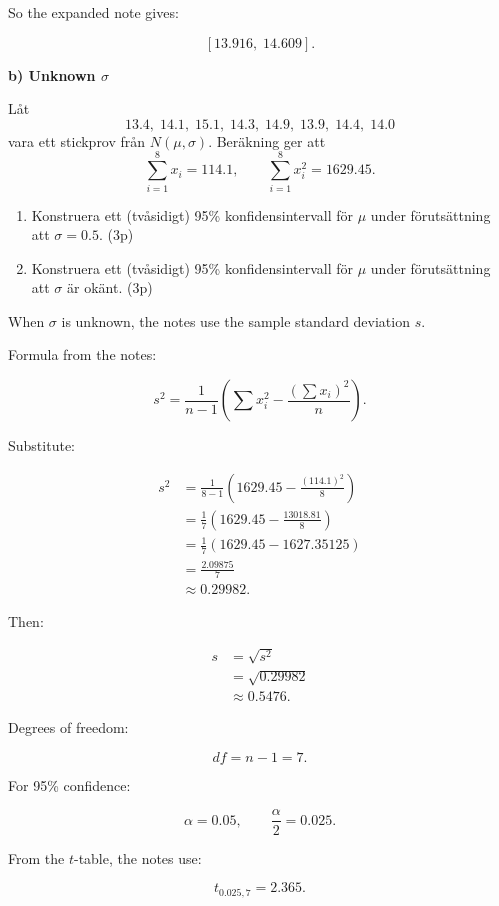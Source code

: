 \documentclass[10pt]{article}
\begin{document}
So the expanded note gives:

\[
[13.916,\;14.609].
\]

\textbf{b) Unknown \(\sigma\)}

Låt
\[
13.4,\;14.1,\;15.1,\;14.3,\;14.9,\;13.9,\;14.4,\;14.0
\]
vara ett stickprov från \(N(\mu,\sigma)\).
Beräkning ger att
\[
\sum_{i=1}^{8}x_i=114.1,
\qquad
\sum_{i=1}^{8}x_i^2=1629.45.
\]

\begin{enumerate}[label=\alph*)]
\item Konstruera ett (tvåsidigt) 95\%
konfidensintervall för \(\mu\) under
förutsättning att \(\sigma=0.5\).
\hfill (3p)

\item Konstruera ett (tvåsidigt) 95\%
konfidensintervall för \(\mu\) under
förutsättning att \(\sigma\) är okänt.
\hfill (3p)
\end{enumerate}

When \(\sigma\) is unknown, the notes use the
sample standard deviation \(s\).

Formula from the notes:

\[
s^2=
\frac{1}{n-1}
\left(
\sum x_i^2
-
\frac{(\sum x_i)^2}{n}
\right).
\]

Substitute:

\begin{align*}
s^2
&=
\frac{1}{8-1}
\left(
1629.45
-
\frac{(114.1)^2}{8}
\right) \\[2mm]
&=
\frac{1}{7}
\left(
1629.45
-
\frac{13018.81}{8}
\right) \\[2mm]
&=
\frac{1}{7}
\left(
1629.45-1627.35125
\right) \\[2mm]
&=
\frac{2.09875}{7} \\[2mm]
&\approx 0.29982.
\end{align*}

Then:

\begin{align*}
s
&=\sqrt{s^2} \\[2mm]
&=\sqrt{0.29982} \\[2mm]
&\approx 0.5476.
\end{align*}

Degrees of freedom:

\[
df=n-1=7.
\]

For 95\% confidence:

\[
\alpha=0.05,
\qquad
\frac{\alpha}{2}=0.025.
\]

From the \(t\)-table, the notes use:

\[
t_{0.025,7}=2.365.
\]
\end{document}

